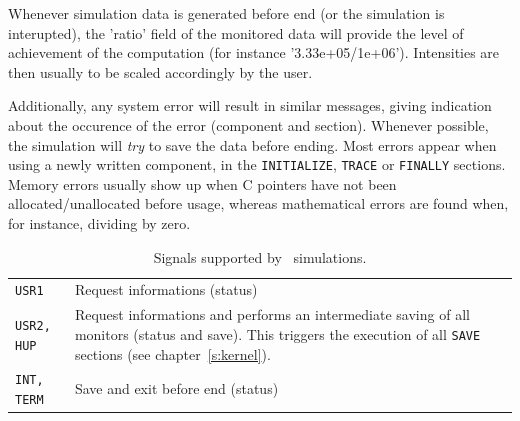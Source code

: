 Whenever simulation data is generated before end (or the simulation is
interupted), the 'ratio' field of the monitored data will provide the
level of achievement of the computation (for instance
'3.33e+05/1e+06'). Intensities are then usually to be scaled
accordingly by the user.

Additionally, any system error will result in similar messages, giving
indication about the occurence of the error (component and
section). Whenever possible, the simulation will {\em try} to save the
data before ending. Most errors appear when using a newly written component, in the \texttt{INITIALIZE}, \texttt{TRACE} or \texttt{FINALLY} sections. Memory errors usually show up when C pointers have not been allocated/unallocated before usage, whereas mathematical errors are found when, for instance, dividing by zero.

\begin{table}
  \begin{center}
    {\let\my=\\
    \begin{tabular}{|p{}|p{}|}
      \hline
      \texttt{USR1} & Request informations (status)  \\
      \texttt{USR2, HUP} & Request informations and performs an intermediate saving of all monitors (status and save). This triggers the execution of all \texttt{SAVE} sections (see chapter~\ref{s:kernel}).  \\
      \texttt{INT, TERM} & Save and exit before end (status)  \\
      \hline
    \end{tabular}
    \caption{Signals supported by \MCX\ simulations.}
    \label{t:signals}
    }
  \end{center}
\end{table}

